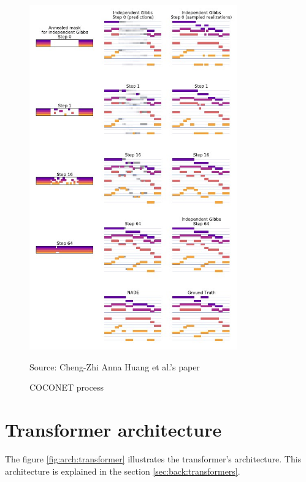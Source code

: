 \documentclass[12pt]{report}
\begin{document}
\begin{figure}[htbp]
    \centering
    \includegraphics[width=0.8\textwidth]{images/related_works/coconet/coconet_process.jpg}
    \caption{COCONET process}
    Source: Cheng-Zhi Anna Huang et al.'s paper \cite{huang_counterpoint_2017}
    \label{fig:coconet_process}
\end{figure}

\section{Transformer architecture}

The figure \ref{fig:arch:transformer} illustrates the transformer's architecture. This architecture is explained in the section \ref{sec:back:transformers}.
\end{document}
